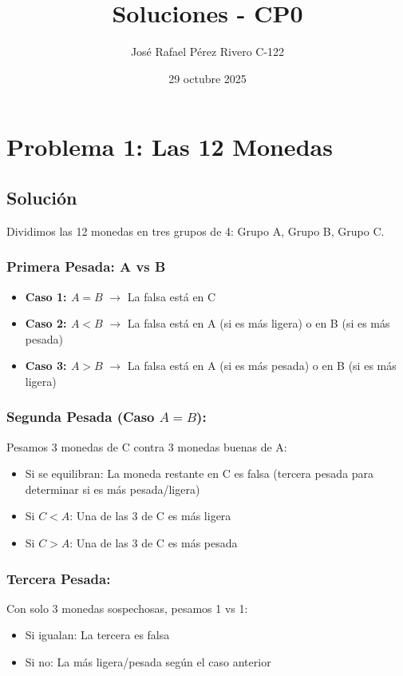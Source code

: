 \documentclass[12pt]{article}
\title{\textbf{Soluciones - CP0}}
\author{José Rafael Pérez Rivero C-122}
\date{29 octubre 2025}
\begin{document}
\maketitle

\section*{Problema 1: Las 12 Monedas}

\subsection*{Solución}

Dividimos las 12 monedas en tres grupos de 4: Grupo A, Grupo B, Grupo C.

\subsubsection*{Primera Pesada: A vs B}

\begin{itemize}
    \item \textbf{Caso 1: $A = B$} $\rightarrow$ La falsa está en C
    \item \textbf{Caso 2: $A < B$} $\rightarrow$ La falsa está en A (si es más ligera) o en B (si es más pesada)
    \item \textbf{Caso 3: $A > B$} $\rightarrow$ La falsa está en A (si es más pesada) o en B (si es más ligera)
\end{itemize}

\subsubsection*{Segunda Pesada (Caso $A = B$):}
Pesamos 3 monedas de C contra 3 monedas buenas de A:
\begin{itemize}
    \item Si se equilibran: La moneda restante en C es falsa (tercera pesada para determinar si es más pesada/ligera)
    \item Si $C < A$: Una de las 3 de C es más ligera
    \item Si $C > A$: Una de las 3 de C es más pesada
\end{itemize}

\subsubsection*{Tercera Pesada:}
Con solo 3 monedas sospechosas, pesamos 1 vs 1:
\begin{itemize}
    \item Si igualan: La tercera es falsa
    \item Si no: La más ligera/pesada según el caso anterior
\end{itemize}
\end{document}

